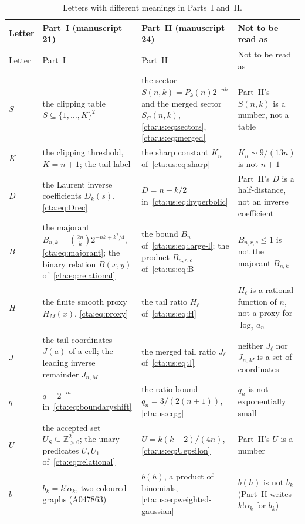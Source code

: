 \documentclass[11pt]{article}
\theoremstyle{definition}
\theoremstyle{remark}
\newcommand{\Npos}{\mathbb Z_{>0}}
\begin{document}
\begin{small}
\begin{longtable}{@{}p{}p{}p{}p{}@{}}
\caption{Letters with different meanings in Parts~I and~II.}\label{cta:tab:notation}\\
\toprule
Letter & Part~I (manuscript 21) & Part~II (manuscript 24) & Not to be read as\\
\midrule
\endfirsthead
\toprule
Letter & Part~I & Part~II & Not to be read as\\
\midrule
\endhead
$S$ & the clipping table $S\subseteq\{1,\dots,K\}^2$ & the sector $S(n,k)=P_k(n)2^{-nk}$ and the merged sector $S_C(n,k)$, \eqref{cta:us:eq:sectors}, \eqref{cta:us:eq:merged} & Part~II's $S(n,k)$ is a number, not a table\\
$K$ & the clipping threshold, $K=n+1$; the tail label & the sharp constant $K_n$ of~\eqref{cta:us:eq:sharp} & $K_n\sim9/(13n)$ is not $n+1$\\
$D$ & the Laurent inverse coefficients $D_k(s)$, \eqref{cta:eq:Drec} & $D=n-k/2$ in~\eqref{cta:us:eq:hyperbolic} & Part~II's $D$ is a half-distance, not an inverse coefficient\\
$B$ & the majorant $B_{n,k}=\binom{2n}k2^{-nk+k^2/4}$, \eqref{cta:eq:majorant}; the binary relation $B(x,y)$ of~\eqref{cta:eq:relational} & the bound $B_n$ of~\eqref{cta:us:eq:large-l}; the product $B_{n,r,c}$ of~\eqref{cta:us:eq:B} & $B_{n,r,c}\le1$ is not the majorant $B_{n,k}$\\
$H$ & the finite smooth proxy $H_M(x)$, \eqref{cta:eq:proxy} & the tail ratio $H_\ell$ of~\eqref{cta:us:eq:H} & $H_\ell$ is a rational function of $n$, not a proxy for $\log_2a_n$\\
$J$ & the tail coordinates $J(a)$ of a cell; the leading inverse remainder $J_{n,M}$ & the merged tail ratio $J_\ell$ of~\eqref{cta:us:eq:J} & neither $J_\ell$ nor $J_{n,M}$ is a set of coordinates\\
$q$ & $q=2^{-m}$ in~\eqref{cta:eq:boundaryshift} & the ratio bound $q_n=3/(2(n+1))$, \eqref{cta:us:eq:g} & $q_n$ is not exponentially small\\
$U$ & the accepted set $U_S\subseteq\Npos^2$; the unary predicates $U,U_1$ of~\eqref{cta:eq:relational} & $U=k(k-2)/(4n)$, \eqref{cta:us:eq:Uepsilon} & Part~II's $U$ is a number\\
$b$ & $b_k=k!\alpha_k$, two-coloured graphs (A047863) & $b(h)$, a product of binomials, \eqref{cta:us:eq:weighted-gaussian} & $b(h)$ is not $b_k$ (Part~II writes $k!\alpha_k$ for $b_k$)\\

\end{longtable}
\end{small}
\end{document}
